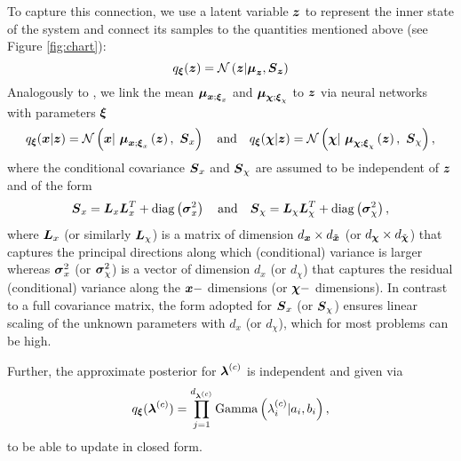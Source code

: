 To capture this connection, we use a latent variable $\boldsymbol{z}$ to represent the inner state of the system and connect its samples to the quantities mentioned above (see Figure \ref{fig:chart}):
\begin{equation}
    q_{\boldsymbol{\xi}} (\boldsymbol{z}) = \mathcal{N}\left( \boldsymbol{z} | \boldsymbol{\mu}_{\boldsymbol{z}}, \boldsymbol{S}_{\boldsymbol{z}} \right) 
\end{equation}
Analogously to \cite{scholz2025weak}, we link the mean $\boldsymbol{\mu}_{\boldsymbol{x};\boldsymbol{\xi}_x}$ and $\boldsymbol{\mu}_{\boldsymbol{\chi};\boldsymbol{\xi}_\chi}$ to $\boldsymbol{z}$ via neural networks with parameters $\boldsymbol{\xi}$
\begin{equation}
    q_{\boldsymbol{\xi}}(\boldsymbol{x} | \boldsymbol{z}) = \mathcal{N}\left( \boldsymbol{x} | ~\boldsymbol{\mu}_{\boldsymbol{x};\boldsymbol{\xi}_x}\left( \boldsymbol{z} \right), ~\boldsymbol{S}_x \right) 
    \quad \mathrm{and} \quad 
    q_{\boldsymbol{\xi}}(\boldsymbol{\chi} | \boldsymbol{z}) = \mathcal{N}\left( \boldsymbol{\chi} | ~\boldsymbol{\mu}_{\boldsymbol{\chi};\boldsymbol{\xi}_\chi}\left( \boldsymbol{z} \right), ~\boldsymbol{S}_{\chi} \right),
\end{equation}
where the conditional covariance $\boldsymbol{S}_{x}$ and $\boldsymbol{S}_{\chi}$ are assumed to be independent of $\boldsymbol{z}$ and of the form
\begin{equation}
    \boldsymbol{S}_x=\boldsymbol{L}_x \boldsymbol{L}_x^T + \mathrm{diag}\left( \boldsymbol{\sigma}_x^2 \right) 
    \quad \mathrm{and} \quad 
    \boldsymbol{S}_\chi=\boldsymbol{L}_\chi \boldsymbol{L}_\chi^T + \mathrm{diag}\left( \boldsymbol{\sigma}_\chi^2 \right),
\end{equation}
where $\boldsymbol{L}_x$ (or similarly $ \boldsymbol{L}_\chi$) is a matrix of dimension $d_{\boldsymbol{x}} \times d_{\tilde{\boldsymbol{x}}}$ (or $d_{\boldsymbol{\chi}} \times d_{\tilde{\boldsymbol{\chi}}}$) that captures the principal directions along which (conditional) variance is larger whereas  $\boldsymbol{\sigma}_x^2$ (or $\boldsymbol{\sigma}_\chi^2$) is a vector of dimension $d_x$ (or $d_\chi$) that captures the residual (conditional) variance along the $\boldsymbol{x}-$ dimensions (or $\boldsymbol{\chi}-$ dimensions).
In contrast to a full covariance matrix, the form adopted for $\boldsymbol{S}_x$ (or $\boldsymbol{S}_\chi$) ensures linear scaling of the unknown parameters with $d_x$ (or $d_\chi$), which for most problems can be high.

Further, the approximate posterior for $\boldsymbol{\lambda}^{(c)}$ is independent and given via
\begin{equation}
    q_{\boldsymbol{\xi}}(\boldsymbol{\lambda}^{(c)}) = \prod_{j=1}^{d_{\boldsymbol{\lambda}^{(c)}}} \mathrm{Gamma}\left(\lambda^{(c)}_i | a_i, b_i \right),
\end{equation}
to be able to update in closed form. 


